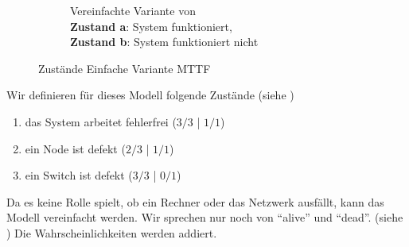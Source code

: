 \documentclass[
            a4paper
            ]{scrartcl}%
\begin{document}
\begin{figure}
\begin{subfigure}[b]{0.48\linewidth}
            \caption{Vereinfachte Variante von  \\
                \textbf{Zustand a}: System funktioniert, \\
                \textbf{Zustand b}: System funktioniert nicht}
            \label{fig:states_simple_mttf_simply}
    \end{subfigure}
    \caption{Zustände Einfache Variante MTTF}
    \label{fig:states_simple_mttf_comb}
\end{figure}

Wir definieren für dieses Modell folgende Zustände (siehe )
\begin{enumerate}[\bfseries a.]
    \item das System arbeitet fehlerfrei ($3/3$ | $1/1$)
    \item ein Node ist defekt ($2/3$ | $1/1$)
    \item ein Switch ist defekt ($3/3$ | $0/1$)
\end{enumerate}

Da es keine Rolle spielt, ob ein Rechner oder das Netzwerk ausfällt, kann das
Modell vereinfacht werden. Wir sprechen nur noch von \enquote{alive} und \enquote{dead}. (siehe
)
Die Wahrscheinlichkeiten werden addiert.
\end{document}
